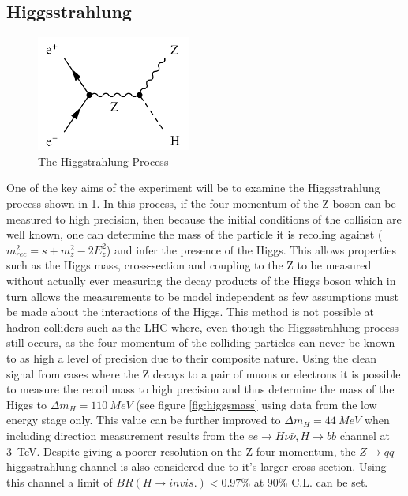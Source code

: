 \subsection{Higgsstrahlung}

\begin{figure}
  \centering
  \includegraphics[width=0.45\textwidth,keepaspectratio]{Theory/fig/HiggsStrahlung.png}
  \caption[The Higgstrahlung Process]{The Higgstrahlung Process}
  \label{fig:higgsstrahlung}
\end{figure}


One of the key aims of the experiment will be to examine the Higgsstrahlung process shown in \ref{fig:higgsstrahlung}. In this process, if the four momentum of the Z boson can be measured to high precision, then because the initial conditions of the collision are well known, one can determine the mass of the particle it is recoling against ($m_{rec}^{2} = s + m_{z}^{2} - 2E_{z}^{2}$) and infer the presence of the Higgs. This allows properties such as the Higgs mass, cross-section and coupling to the Z to be measured without actually ever measuring the decay products of the Higgs boson which in turn allows the measurements to be model independent as few assumptions must be made about the interactions of the Higgs. This method is not possible at hadron colliders such as the LHC where, even though the Higgsstrahlung process still occurs, as the four momentum of the colliding particles can never be known to as high a level of precision due to their composite nature. Using the clean signal from cases where the Z decays to a pair of muons or electrons it is possible to measure the recoil mass to high precision and thus determine the mass of the Higgs to $\Delta m_{H} = 110~MeV$ (see figure \ref{fig:higgsmass} using data from the low energy stage only. This value can be further improved to $\Delta m_{H} = 44~MeV$ when including direction measurement results from the $ee\rightarrow H\nu\bar{\nu}, H\rightarrow b\bar{b}$ channel at 3~TeV. Despite giving a poorer resolution on the Z four momentum, the $Z\rightarrow qq$ higgsstrahlung channel is also considered due to it's larger cross section. Using this channel a limit of $BR(H\rightarrow invis.) <0.97\%$ at 90\% C.L. can be set. 

